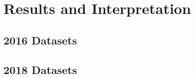 \chapter{Results and Interpretation}

\section{2016 Datasets}

\lipsum  %

\section{2018 Datasets}

\lipsum  %
